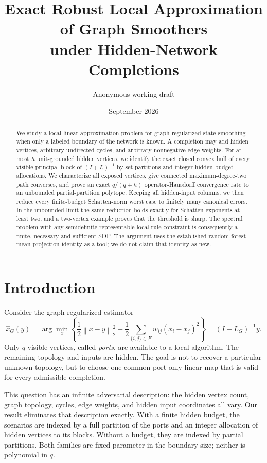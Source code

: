 \documentclass[11pt]{article}
\title{Exact Robust Local Approximation of Graph Smoothers\\
under Hidden-Network Completions}
\author{Anonymous working draft}
\date{September 2026}
\theoremstyle{definition}
\theoremstyle{remark}
\newcommand{\norm}[1]{\left\lVert #1\right\rVert}
\begin{document}
\maketitle

\begin{abstract}
We study a local linear approximation problem for graph-regularized state
smoothing when only a labeled boundary of the network is known.  A completion
may add hidden vertices, arbitrary undirected cycles, and arbitrary
nonnegative edge weights.  For at most $h$ unit-grounded hidden vertices, we
identify the exact closed convex hull of every visible principal block of
$(I+L)^{-1}$ by set partitions and integer hidden-budget allocations.  We
characterize all exposed vertices, give connected maximum-degree-two path
converses, and prove an exact $q/(q+h)$ operator-Hausdorff convergence rate to
an unbounded partial-partition polytope.  Keeping all hidden-input columns, we
then reduce every finite-budget Schatten-norm worst case to finitely many
canonical errors.  In the unbounded limit the same reduction holds exactly
for Schatten exponents at least two, and a two-vertex example proves that the
threshold is sharp.  The spectral problem with any semidefinite-representable
local-rule constraint is consequently a finite, necessary-and-sufficient SDP.
The argument uses the established random-forest mean-projection identity as a
tool; we do not claim that identity as new.
\end{abstract}

\section{Introduction}

Consider the graph-regularized estimator
\begin{equation}
  \widehat x_G(y)
  =\arg\min_x\left\{
       \frac12\norm{x-y}_2^2
       +\frac12\sum_{\{i,j\}\in E}w_{ij}(x_i-x_j)^2
    \right\}
  =(I+L_G)^{-1}y .
  \label{eq:smoother}
\end{equation}
Only $q$ visible vertices, called \emph{ports}, are available to a local
algorithm.  The remaining topology and inputs are hidden.  The goal is not to
recover a particular unknown topology, but to choose one common port-only
linear map that is valid for every admissible completion.

This question has an infinite adversarial description: the hidden vertex
count, graph topology, cycles, edge weights, and hidden input coordinates all
vary.  Our result eliminates that description exactly.  With a finite hidden
budget, the scenarios are indexed by a full partition of the ports and an
integer allocation of hidden vertices to its blocks.  Without a budget, they
are indexed by partial partitions.  Both families are fixed-parameter in the
boundary size; neither is polynomial in $q$.
\end{document}
